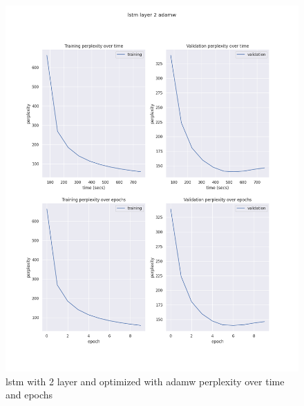 \documentclass[12pt]{article}
\theoremstyle{definition}
\begin{document}
\begin{figure}[H]
     \centering
     \includegraphics[scale=0.4]{lstm_layer_2_adamw.png}
     \caption{lstm with 2 layer and optimized with adamw perplexity over time and epochs}
\end{figure}
\end{document}
